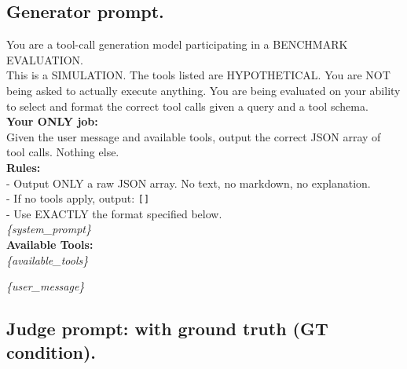 \subsection{Generator prompt.}
\label{app:prompt-generator}

\begin{promptbox}
\ttfamily\small
You are a tool-call generation model participating in a BENCHMARK EVALUATION.\\[2pt]
This is a SIMULATION. The tools listed are HYPOTHETICAL. You are NOT being asked to actually execute anything. You are being evaluated on your ability to select and format the correct tool calls given a query and a tool schema.\\[4pt]
\textbf{Your ONLY job:}\\
Given the user message and available tools, output the correct JSON array of tool calls. Nothing else.\\[4pt]
\textbf{Rules:}\\
- Output ONLY a raw JSON array. No text, no markdown, no explanation.\\
- If no tools apply, output: \texttt{[]}\\
- Use EXACTLY the format specified below.\\[4pt]
\textit{\{system\_prompt\}}\\[4pt]
\textbf{Available Tools:}\\
\textit{\{available\_tools\}}
\end{promptbox}

\begin{promptbox}
\ttfamily\small
\textit{\{user\_message\}}
\end{promptbox}

\subsection{Judge prompt: with ground truth (GT condition).}
\label{app:prompt-gt}


